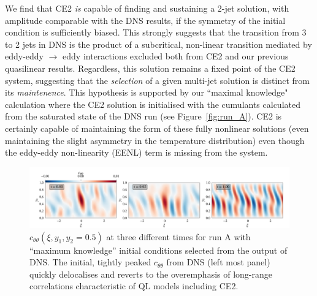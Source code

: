 \documentclass{jfm}
\newcommand{\ctt}{c_{\theta \theta}}
\begin{document}
We find that CE2 \emph{is} capable of finding and sustaining a 2-jet solution, with amplitude comparable with the DNS results, if the symmetry of the initial condition is sufficiently biased.
This strongly suggests that the transition from 3 to 2 jets in DNS is the product of a subcritical, non-linear transition mediated by eddy-eddy $\to$ eddy interactions excluded both from CE2 and our previous quasilinear results.
Regardless, this solution remains a fixed point of the CE2 system, suggesting that the \emph{selection} of a given multi-jet solution is distinct from its \emph{maintenence}.
This hypothesis is supported by our ``maximal knowledge" calculation where the CE2 solution is initialised with the cumulants calculated from the saturated state of the DNS run (see Figure~\ref{fig:run_A}). CE2 is certainly capable of maintaining the form of these fully nonlinear solutions (even maintaining the slight asymmetry in the temperature distribution) even though the eddy-eddy non-linearity (EENL) term is missing from the system.


\begin{figure}
    \centering
    \includegraphics[width=\textwidth]{../../figs/run_A_decoherence.pdf}
    \caption{$\ctt(\xi, y_1, y_2 = 0.5)$ at three different times for run A with ``maximum knowledge'' initial conditions selected from the output of DNS. The initial, tightly peaked $\ctt$ from DNS (left most panel) quickly delocalises and reverts to the overemphasis of long-range correlations characteristic of QL models including CE2.}
    \label{fig:run_A_decoherence}
\end{figure}
\end{document}
